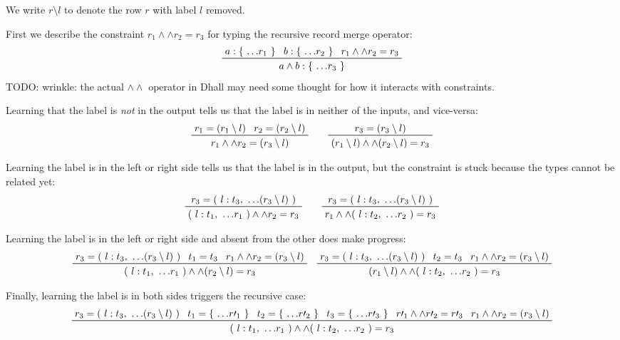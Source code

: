 \documentclass[11pt, twoside, reqno]{book}
\providecommand{\wedgeonwedge}{\land\land}
\begin{document}
We write \(r \setminus l\) to denote the row \(r\) with label \(l\) removed.

First we describe the constraint \(r_1 \wedgeonwedge r_2 = r_3\) for typing the recursive record merge operator:
\begin{displaymath}
\prftree{a : \{\ \dots\!r_1\ \}}{b : \{\ \dots\!r_2\ \}}{r_1 \wedgeonwedge r_2 = r_3}{a \land b : \{\ \dots\!r_3\ \}}
\end{displaymath}
TODO: wrinkle: the actual \(\wedgeonwedge\) operator in Dhall may need some thought for how it interacts with constraints.

Learning that the label is \emph{not} in the output tells us that the label is in neither of the inputs, and vice-versa:
\begin{displaymath}
\prftree{r_1 = (r_1 \setminus l)}{r_2 = (r_2 \setminus l)}{r_1 \wedgeonwedge r_2 = (r_3 \setminus l)}
\qquad
\prftree{r_3 = (r_3 \setminus l)}{(r_1 \setminus l) \wedgeonwedge (r_2 \setminus l) = r_3}
\end{displaymath}

Learning the label is in the left or right side tells us that the label is in the output, but the constraint is stuck because the types cannot be related yet:
\begin{displaymath}
\prftree
  {r_3 = (\ l : t_3,\ \dots\!(r_3 \setminus l)\ )}
  {(\ l : t_1,\ \dots\!r_1\ ) \wedgeonwedge r_2 = r_3}
\qquad
\prftree
  {r_3 = (\ l : t_3,\ \dots\!(r_3 \setminus l)\ )}
  {r_1 \wedgeonwedge (\ l : t_2,\ \dots\!r_2\ ) = r_3}
\end{displaymath}

Learning the label is in the left or right side and absent from the other does make progress:
\begin{displaymath}
\prftree
  {r_3 = (\ l : t_3,\ \dots\!(r_3 \setminus l)\ )}
  {t_1 = t_3}
  {r_1 \wedgeonwedge r_2 = (r_3 \setminus l)}
  {(\ l : t_1,\ \dots\!r_1\ ) \wedgeonwedge (r_2 \setminus l) = r_3}
\quad
\prftree
  {r_3 = (\ l : t_3,\ \dots\!(r_3 \setminus l)\ )}
  {t_2 = t_3}
  {r_1 \wedgeonwedge r_2 = (r_3 \setminus l)}
  {(r_1 \setminus l) \wedgeonwedge (\ l : t_2,\ \dots\!r_2\ ) = r_3}
\end{displaymath}

Finally, learning the label is in both sides triggers the recursive case:
\begin{displaymath}
\prftree
  {r_3 = (\ l : t_3,\ \dots\!(r_3 \setminus l)\ )}
  {t_1 = \{\ \dots\!r\prime_1\ \}}
  {t_2 = \{\ \dots\!r\prime_2\ \}}  
  {t_3 = \{\ \dots\!r\prime_3\ \}}
  {r\prime_1 \wedgeonwedge r\prime_2 = r\prime_3}
  {r_1 \wedgeonwedge r_2 = (r_3 \setminus l)}
  {(\ l : t_1,\ \dots\!r_1\ ) \wedgeonwedge (\ l : t_2,\ \dots\!r_2\ ) = r_3}
\end{displaymath}
\end{document}
